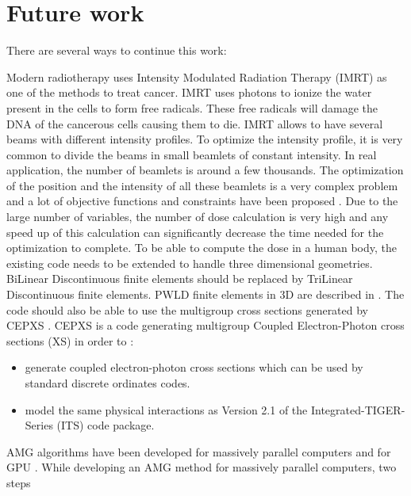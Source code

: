 \section{Future work}
There are several ways to continue this work:
\begin{long_description}
  \item[Extension for medical applications:] Modern radiotherapy uses Intensity 
    Modulated Radiation Therapy (IMRT) as one of the methods to
    treat cancer. IMRT uses photons to ionize the water present in the cells
    to form free radicals. These free radicals will damage the DNA of the
    cancerous cells causing them to die. IMRT allows to have several beams with 
    different intensity  profiles. To optimize the intensity profile, it is 
    very common to divide the beams in small beamlets of constant intensity. 
    In real application, the number of beamlets is around a few thousands. 
    The optimization of the position and the intensity of all these beamlets
    is a very complex problem and a lot of objective functions and 
    constraints have been proposed \cite{minima,dose-volume,complexity,math}.
    Due to the large number of variables, the number of dose calculation is
    very high and any speed up of this calculation can significantly decrease
    the time needed for the optimization to complete.
    To be able to compute the dose in a human body, the existing code needs 
    to be extended to handle three dimensional geometries. BiLinear 
    Discontinuous finite elements should be replaced by TriLinear Discontinuous 
    finite elements. PWLD finite elements in 3D are described in \cite{pwld_3d}. 
    The code should also be able to use the multigroup cross sections generated by 
    CEPXS \cite{cepxs}. CEPXS is a code generating multigroup Coupled 
    Electron-Photon cross sections (XS) in order to \cite{cepxs}:
    \begin{itemize}
      \item generate coupled electron-photon cross sections which can be used by
        standard discrete ordinates codes.
      \item model the same physical interactions as Version 2.1 of the
        Integrated-TIGER-Series (ITS) code package.
    \end{itemize}
  \item[AMG for DSA on massively parallel computers:] AMG algorithms have been 
    developed for massively parallel
    computers \cite{amg_multicore,amg_parallel} and for GPU \cite{nvidia}.
    While developing an AMG method for massively parallel computers, two steps

\end{long_description}
